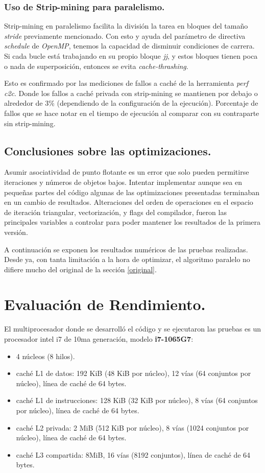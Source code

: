 \documentclass{article}
\begin{document}
\subsubsection{Uso de Strip-mining para paralelismo.\label{strip-mining-parallel}}
Strip-mining en paralelismo facilita la división la tarea en bloques del tamaño \textit{stride}
previamente mencionado. Con esto y ayuda del parámetro de directiva \textit{schedule} de \textit{OpenMP},
tenemos la capacidad de disminuir condiciones de carrera. Si cada bucle está trabajando en su propio bloque
\textit{jj}, y estos bloques tienen poca o nada de superposición, entonces se evita
\textit{cache-thrashing}.

Esto es confirmado por las mediciones de fallos a caché de la herramienta \textit{perf c2c}.
Donde los fallos a caché privada con strip-mining se mantienen por debajo o alrededor de 3\%
(dependiendo de la configuración de la ejecución). Porcentaje de fallos que se hace notar en
el tiempo de ejecución al comparar con su contraparte sin strip-mining.


\subsection{Conclusiones sobre las optimizaciones.\label{opt_conclusiones}}
Asumir asociatividad de punto flotante es un error que solo pueden permitirse iteraciones
y números de objetos bajos. Intentar implementar aunque sea en pequeñas partes del código algunas de
las optimizaciones presentadas terminaban en un cambio de resultados. Alteraciones del orden de operaciones
en el espacio de iteración triangular, vectorización, y flags del compilador, fueron las principales
variables a controlar para poder mantener los resultados de la primera versión.


A continuación se exponen los resultados numéricos de las pruebas realizadas.
Desde ya, con tanta limitación a la hora de optimizar, el algoritmo paralelo no difiere mucho del
original de la sección \ref{original}.

\section{Evaluación de Rendimiento.\label{performance}}
El multiprocesador donde se desarrolló el código y se ejecutaron las pruebas es un
procesador intel i7 de 10ma generación, modelo \textbf{i7-1065G7}:
\begin{itemize}
	\item 4 núcleos (8 hilos).
	\item caché L1 de datos: 192 KiB (48 KiB por núcleo), 12 vías (64 conjuntos por núcleo), línea de caché de 64 bytes.
	\item caché L1 de instrucciones: 128 KiB (32 KiB por núcleo), 8 vías (64 conjuntos por núcleo), línea de caché de 64 bytes.
	\item caché L2 privada: 2 MiB (512 KiB por núcleo), 8 vías (1024 conjuntos por núcleo), línea de caché de 64 bytes.
	\item caché L3 compartida: 8MiB, 16 vías (8192 conjuntos), línea de caché de 64 bytes.
\end{itemize}
\end{document}
